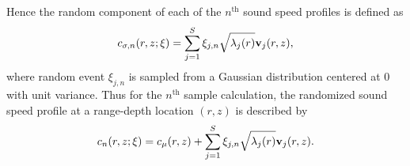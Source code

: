 Hence the random component of each of the $n^{\text{th}}$ sound speed
profiles is defined as
\begin{align*}
  c_{\sigma,n}(r,z;\xi) = \sum_{j=1}^S \xi_{j,n} \sqrt{\lambda_j(r)}\boldsymbol{\mathbf{v}}_j(r,z),
\end{align*}
where random event $\xi_{j,n}$ is sampled from a Gaussian distribution
centered at $0$ with unit variance. Thus for the $n^{\text{th}}$ sample calculation, the 
randomized sound speed profile at a range-depth location $(r,z)$ is described by
\begin{align*}
  c_n(r,z;\xi) = c_\mu(r,z) + \sum_{j=1}^S \xi_{j,n} \sqrt{\lambda_j(r)}\boldsymbol{\mathbf{v}}_j(r,z).
\end{align*}







